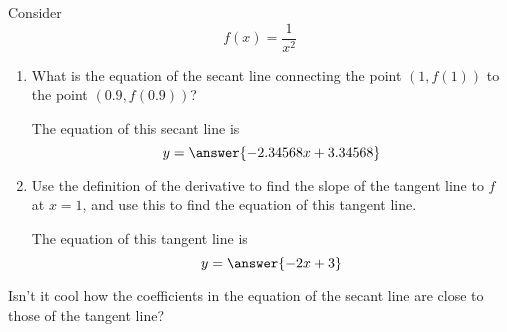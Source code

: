 \documentclass{ximera}
\author{Steven Gubkin}
\begin{document}
\begin{exercise}



Consider 
\[
f(x) = \frac{1}{x^2}
\]



\begin{enumerate}
\item What is the equation of the secant line connecting the point $(1,f(1))$ to the point $(0.9,f(0.9))$? 
\begin{prompt} 
The equation of this secant line is
$$ y = \answer{ -2.34568x+ 3.34568}$$ 
\end{prompt}

\item  Use the definition of the derivative to find the slope of the tangent line to $f$ at $x=1$, and use this to find the equation of this tangent line.

\begin{prompt} 
The equation of this tangent line is
$$ y = \answer{ -2x + 3}$$ 
\end{prompt}

\end{enumerate}

Isn't it cool how the coefficients in the equation of the secant line are close to those of the tangent line?
\end{exercise}
\end{document}
